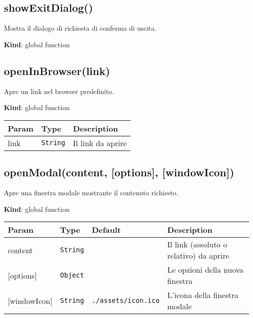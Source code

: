 \protect\hypertarget{showExitDialog}{}{}

\hypertarget{showexitdialog}{%
\subsection{showExitDialog()}\label{showexitdialog}}

Mostra il dialogo di richiesta di conferma di uscita.

\textbf{Kind}: global function\\
\protect\hypertarget{openInBrowser}{}{}

\hypertarget{openinbrowserlink}{%
\subsection{openInBrowser(link)}\label{openinbrowserlink}}

Apre un link nel browser predefinito.

\textbf{Kind}: global function

\begin{tabularx}{\textwidth}{XXX}
\toprule
Param & Type & Description\tabularnewline
\midrule
\endhead
link & \texttt{String} & Il link da aprire\tabularnewline
\bottomrule
\end{tabularx}

\protect\hypertarget{openModal}{}{}

\hypertarget{openmodalcontent-options-windowicon}{%
\subsection{openModal(content, {[}options{]},
{[}windowIcon{]})}\label{openmodalcontent-options-windowicon}}

Apre una finestra modale mostrante il contenuto richiesto.

\textbf{Kind}: global function

\begin{tabularx}{\textwidth}{XXXX}
\toprule
Param & Type & Default & Description\tabularnewline
\midrule
\endhead
content & \texttt{String} & & Il link (assoluto o relativo) da
aprire\tabularnewline
{[}options{]} & \texttt{Object} & & Le opzioni della nuova
finestra\tabularnewline
{[}windowIcon{]} & \texttt{String} & \texttt{./assets/icon.ico} &
L'icona della finestra modale\tabularnewline
\bottomrule
\end{tabularx}

\protect\hypertarget{openOnKeyboardShortcut}{}{}

